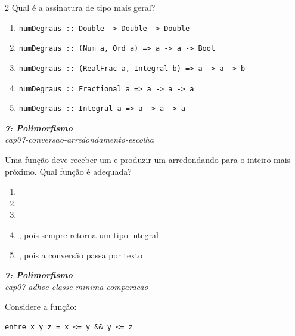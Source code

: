 \documentclass[a4paper,10pt,brazil]{article}
\begin{document}
\begin{multicols}{2}
Qual é a assinatura de tipo mais geral?

\begin{enumerate}
  \item \texttt{numDegraus :: Double -> Double -> Double}
  \item \texttt{numDegraus :: (Num a, Ord a) => a -> a -> Bool}
  \item \texttt{numDegraus :: (RealFrac a, Integral b) => a -> a -> b}
  \item \texttt{numDegraus :: Fractional a => a -> a -> a}
  \item \texttt{numDegraus :: Integral a => a -> a -> a}

\end{enumerate}

\begin{flushright}
  \footnotesize
  \textit{\textbf{7: Polimorfismo}}\\
  \textit{cap07-conversao-arredondamento-escolha}\\

\end{flushright}
Uma função deve receber um  e produzir um  arredondando para o inteiro mais próximo. Qual função é adequada?
\begin{enumerate}
  \item {}
  \item {}
  \item {}
  \item {}, pois sempre retorna um tipo integral
  \item {}, pois a conversão passa por texto

\end{enumerate}

\begin{flushright}
  \footnotesize
  \textit{\textbf{7: Polimorfismo}}\\
  \textit{cap07-adhoc-classe-minima-comparacao}\\

\end{flushright}
Considere a função:

\begin{verbatim}
entre x y z = x <= y && y <= z
\end{verbatim}


\end{multicols}
\end{document}
